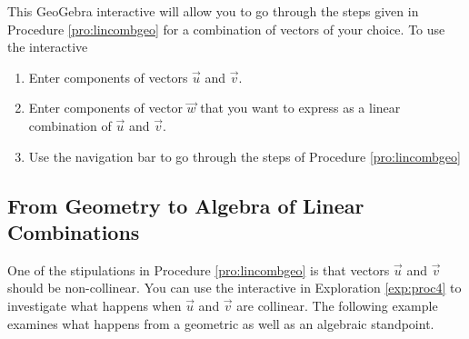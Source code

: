 \documentclass{ximera}
\begin{document}
\begin{exploration}\label{exp:proc4}
This GeoGebra interactive will allow you to go through the steps given in Procedure \ref{pro:lincombgeo} for a combination of vectors of your choice.  To use the interactive
\begin{enumerate}
    \item Enter components of vectors $\vec{u}$ and $\vec{v}$.
    \item Enter components of vector $\vec{w}$ that you want to express as a linear combination of $\vec{u}$ and $\vec{v}$.
    \item Use the navigation bar to go through the steps of Procedure \ref{pro:lincombgeo}
\end{enumerate}


\begin{onlineOnly}
\begin{center} 
\end{center}
\end{onlineOnly}

\end{exploration}

\subsection*{From Geometry to Algebra of Linear Combinations}
One of the stipulations in Procedure \ref{pro:lincombgeo} is that vectors $\vec{u}$ and $\vec{v}$ should be non-collinear.  You can use the interactive in Exploration \ref{exp:proc4} to investigate what happens when $\vec{u}$ and $\vec{v}$ are collinear.  The following example examines what happens from a geometric as well as an algebraic standpoint.
\end{document}
